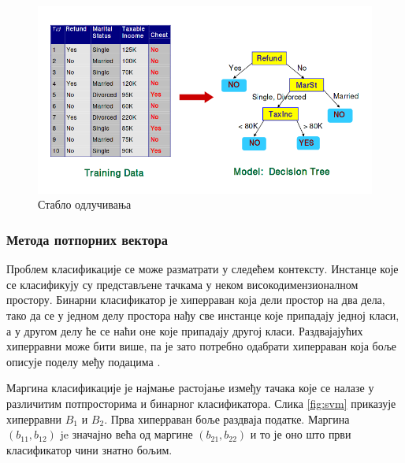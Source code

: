\documentclass[a4paper]{article}
\begin{document}
{\begin{figure}[h!]
\begin{center}
\includegraphics[scale=0.4]{decision_tree.png}
\end{center}
\caption{Стабло одлучивања}
\label{fig:stablo}
\end{figure}


\subsubsection*{Метода потпорних вектора}
Проблем класификације се може разматрати у следећем контексту. Инстанце које се класификују су представљене тачкама у неком високодимензионалном простору. Бинарни класификатор је хиперраван која дели простор на два дела, тако да се у једном делу простора нађу све инстанце које припадају једној класи, а у другом делу ће се наћи оне које припадају другој класи. Раздвајајућих хиперравни може бити више, па је зато потребно одабрати хиперраван која боље описује поделу међу подацима \cite{svm-intro}.


Маргина класификације је најмање растојање између тачака које се налазе у различитим потпросторима и бинарног класификатора. Слика \ref{fig:svm} приказује хиперравни $B_1$ и $B_2$. Прва хиперраван боље раздваја податке. Маргина $(b_11, b_12)$ je значајно већа од маргине $(b_{21}, b_{22})$ и то је оно што први класификатор чини знатно бољим.

}
\end{document}
